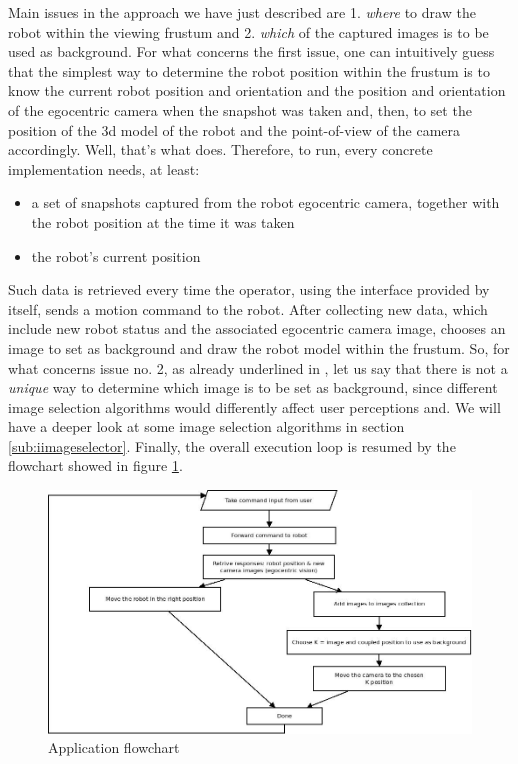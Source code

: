 %
Main issues in the approach we have just described are 1. 
\textit{where} to draw the robot within the viewing frustum 
and 2. \textit{which} of the captured images is to be used 
as background.
%
For what concerns the first issue, one can intuitively guess 
that the simplest way to determine the robot position 
within the frustum is to know the current robot position 
and orientation and the position and orientation of the egocentric 
camera when the snapshot was taken and, then, to set the 
position of the 3d model of the robot and the point-of-view 
of the camera accordingly.
Well, that's what \framework{} does.
%
Therefore, to run, every \framework{} concrete implementation 
needs, at least:
%
\begin{itemize}
  \item a set of snapshots captured from the robot egocentric camera, 
    together with the robot position at the time it was taken
  \item the robot's current position
\end{itemize}
%
Such data is retrieved every time the operator, using the 
interface provided by \framework{} itself, sends a 
motion command to the robot.
%
After collecting new data, which include new robot status and
the associated egocentric camera image, \framework{} chooses 
an image to set as background and draw the robot model within 
the frustum. So, for what concerns issue no. 2, as already 
underlined in \cite{sugimoto}, let us say that there is not 
a \textit{unique} way to determine which image is to be set 
as background, since different image selection algorithms 
would differently affect user perceptions and. We will have a 
deeper look at some image selection algorithms in section
\ref{sub:iimageselector}.
%
Finally, the overall execution loop is resumed by the flowchart 
showed in figure \ref{fig:overall_diagram}.
%
\begin{figure}[!h]
  \begin{center}
    \includegraphics[width=400pt]{img/overall_diagram.jpeg}  %
    \caption{Application flowchart}
    \label{fig:overall_diagram}
  \end{center}
\end{figure}


